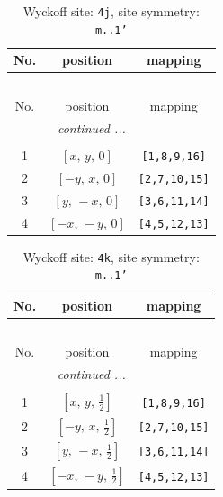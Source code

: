 \documentclass[fleqn,8pt]{jsarticle}
\begin{document}
\begin{longtable}{ccc}
\caption{Wyckoff site: {\tt 4j}, site symmetry: {\tt m..1'}}
 \\
 \hline \hline
No. & position & mapping \\ \hline \endfirsthead

\multicolumn{2}{l}{\tablename\ \thetable{}} \\
 \hline \hline
No. & position & mapping \\ \hline \endhead

 \hline \hline
\multicolumn{2}{r}{\footnotesize\it continued ...} \\ \endfoot

 \hline \hline
\multicolumn{2}{r}{} \\ \endlastfoot

1 & $\left[ x,\, y,\, 0 \right]$ & {\tt [1,8,9,16]} \\ \hline
2 & $\left[ - y,\, x,\, 0 \right]$ & {\tt [2,7,10,15]} \\ \hline
3 & $\left[ y,\, - x,\, 0 \right]$ & {\tt [3,6,11,14]} \\ \hline
4 & $\left[ - x,\, - y,\, 0 \right]$ & {\tt [4,5,12,13]} \\
\end{longtable}
\renewcommand{\arraystretch}{1.2}
\begin{longtable}{ccc}
\caption{Wyckoff site: {\tt 4k}, site symmetry: {\tt m..1'}}
 \\
 \hline \hline
No. & position & mapping \\ \hline \endfirsthead

\multicolumn{2}{l}{\tablename\ \thetable{}} \\
 \hline \hline
No. & position & mapping \\ \hline \endhead

 \hline \hline
\multicolumn{2}{r}{\footnotesize\it continued ...} \\ \endfoot

 \hline \hline
\multicolumn{2}{r}{} \\ \endlastfoot

1 & $\left[ x,\, y,\, \frac{1}{2} \right]$ & {\tt [1,8,9,16]} \\ \hline
2 & $\left[ - y,\, x,\, \frac{1}{2} \right]$ & {\tt [2,7,10,15]} \\ \hline
3 & $\left[ y,\, - x,\, \frac{1}{2} \right]$ & {\tt [3,6,11,14]} \\ \hline
4 & $\left[ - x,\, - y,\, \frac{1}{2} \right]$ & {\tt [4,5,12,13]} \\
\end{longtable}
\end{document}
